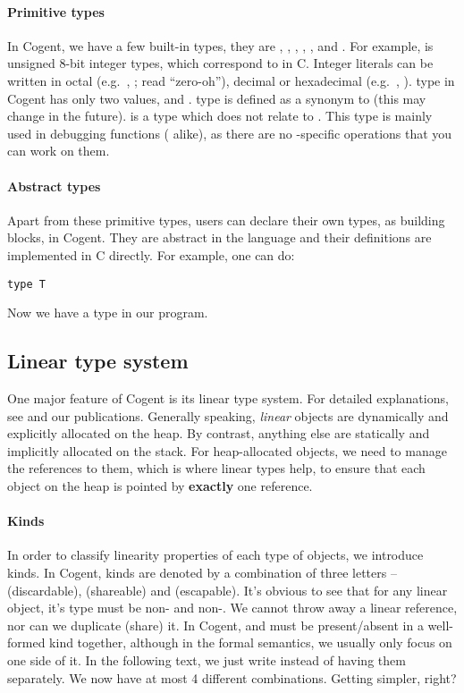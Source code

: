 \documentclass[a4paper]{article}
\newcommand{\cogent}{Cogent\xspace}
\begin{document}
\paragraph{Primitive types} In \cogent, we have a few built-in types, they are , , , ,
,  and . For example,  is unsigned 8-bit integer types, which correspond to
 in C. Integer literals can be written in octal (e.g.\ , ; read ``zero-oh''), decimal or hexadecimal
(e.g.\ , ).  type in \cogent has only two values,  and .
 type is defined as a synonym to  (this may change in the future).  is a type which
does not relate to . This type is mainly used in debugging functions ( alike), as there are
no -specific operations that you can work on them.

\paragraph{Abstract types} Apart from these primitive types, users can declare their own types, as building blocks, in \cogent.
They are abstract in the language and their definitions are implemented in C directly. For example, one can do:
\begin{lstlisting}[language=Cogent]
type T
\end{lstlisting}
Now we have a type  in our program.

\subsection{Linear type system}
One major feature of \cogent is its linear type system. For detailed explanations, see \cite{Wadler_90} and our publications.
Generally speaking, \emph{linear} objects are dynamically and explicitly allocated on the heap. By contrast, anything else are 
statically and implicitly allocated on the stack. For heap-allocated objects, we need to manage the references to them, which is
where linear types help, to ensure that each object on the heap is pointed by \textbf{exactly} one reference. 

\paragraph{Kinds} In order to classify linearity properties of each type of objects, we introduce kinds.
In \cogent, kinds are denoted by a combination of three letters --  (discardable),  (shareable) and  (escapable).
It's obvious to see that for any linear object, it's type must be non- and non-. We cannot throw away
a linear reference, nor can we duplicate (share) it. In \cogent,  and  must be present/absent in a well-formed kind together,
although in the formal semantics, we usually only focus on one side of it. In the following text, we just write  instead of
having them separately. We now have at most 4 different combinations. Getting simpler, right?
\end{document}
